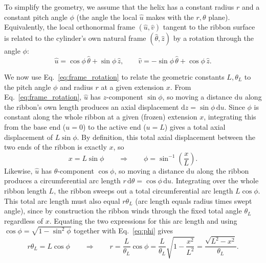\documentclass[11pt]{article}
\begin{document}
To simplify the geometry, we assume that the helix has a constant radius $r$ and a constant pitch angle $\phi$ (the angle the local $\hat{u}$ makes with the $r,\theta$ plane). Equivalently, the local orthonormal frame $(\hat u,\hat v)$ tangent to the ribbon surface is related to the cylinder's own natural frame $(\hat\theta,\hat z)$ by a rotation through the angle $\phi$:
\begin{equation}\label{eq:frame_rotation}
    \hat u = \cos\phi\,\hat\theta + \sin\phi\,\hat z, \qquad
    \hat v = -\sin\phi\,\hat\theta + \cos\phi\,\hat z.
\end{equation}

We now use Eq.~\eqref{eq:frame_rotation} to relate the geometric constants $L,\theta_L$ to the pitch angle $\phi$ and radius $r$ at a given extension $x$. From Eq.~\eqref{eq:frame_rotation}, $\hat u$ has $z$-component $\sin\phi$, so moving a distance $\mathrm du$ along the ribbon's own length produces an axial displacement $\mathrm dz=\sin\phi\,\mathrm du$. Since $\phi$ is constant along the whole ribbon at a given (frozen) extension $x$, integrating this from the base end ($u=0$) to the active end ($u=L$) gives a total axial displacement of $L\sin\phi$. By definition, this total axial displacement between the two ends of the ribbon is exactly $x$, so
\begin{equation}\label{eq:phi}
    x = L\sin\phi \qquad\Longrightarrow\qquad \phi = \sin^{-1}\left(\frac{x}{L}\right).
\end{equation}
Likewise, $\hat u$ has $\theta$-component $\cos\phi$, so moving a distance $\mathrm du$ along the ribbon produces a circumferential arc length $r\,\mathrm d\theta = \cos\phi\,\mathrm du$. Integrating over the whole ribbon length $L$, the ribbon sweeps out a total circumferential arc length $L\cos\phi$. This total arc length must also equal $r\theta_L$ (arc length equals radius times swept angle), since by construction the ribbon winds through the fixed total angle $\theta_L$ regardless of $x$. Equating the two expressions for this arc length and using $\cos\phi=\sqrt{1-\sin^2\phi}$ together with Eq.~\eqref{eq:phi} gives
\begin{equation}\label{eq:r}
    r\theta_L = L\cos\phi \qquad\Longrightarrow\qquad r = \frac{L}{\theta_L}\cos\phi = \frac{L}{\theta_L}\sqrt{1-\frac{x^2}{L^2}} = \frac{\sqrt{L^2 - x^2}}{\theta_L}.
\end{equation}
\end{document}
